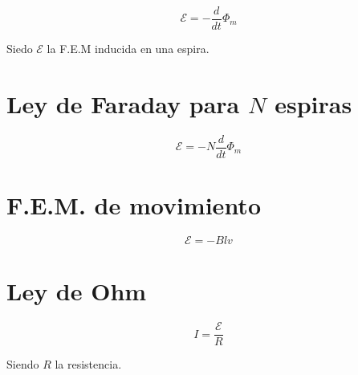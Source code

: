 \documentclass[a4, 12pt]{report}
\begin{document}
      \begin{equation*}
        \mathcal{E}=-\frac{d}{dt}\Phi_m
      \end{equation*}

      \indent Siedo $\mathcal{E}$ la F.E.M inducida en una espira.

    \section*{Ley de Faraday para $N$ espiras}

      \begin{equation*}
        \mathcal{E}=-N\frac{d}{dt}\Phi_m
      \end{equation*}

    \section*{F.E.M. de movimiento}

    \begin{equation*}
      \mathcal{E}=-Blv
    \end{equation*}

    \section*{Ley de Ohm}
    
      \begin{equation*}
        I=\frac{\mathcal{E}}{R}
      \end{equation*}
      
      \indent Siendo $R$ la resistencia.
\end{document}
